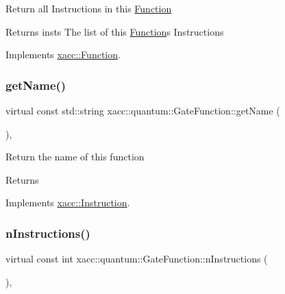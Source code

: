 Return all Instructions in this \hyperlink{a02456}{Function}

\begin{DoxyReturn}{Returns}
insts The list of this \hyperlink{a02456}{Function}\textquotesingle{}s Instructions 
\end{DoxyReturn}


Implements \hyperlink{a02456_aaf80bd3d49113a92b520785572663032}{xacc\+::\+Function}.

\mbox{\label{a01272_af42efb6191267164717d53c469e15d3a}} 
\subsubsection{\texorpdfstring{get\+Name()}{getName()}}
{\footnotesize\ttfamily virtual const std\+::string xacc\+::quantum\+::\+Gate\+Function\+::get\+Name (\begin{DoxyParamCaption}{ }\end{DoxyParamCaption})\hspace{0.3cm}{\ttfamily [inline]}, {\ttfamily [virtual]}}

Return the name of this function \begin{DoxyReturn}{Returns}

\end{DoxyReturn}


Implements \hyperlink{a02460_ac7ff23f693e2276edbf3fdac5452792c}{xacc\+::\+Instruction}.

\mbox{\label{a01272_aa70b26156c060fec71316fe5e98bb102}} 
\subsubsection{\texorpdfstring{n\+Instructions()}{nInstructions()}}
{\footnotesize\ttfamily virtual const int xacc\+::quantum\+::\+Gate\+Function\+::n\+Instructions (\begin{DoxyParamCaption}{ }\end{DoxyParamCaption})\hspace{0.3cm}{\ttfamily [inline]}, {\ttfamily [virtual]}}

